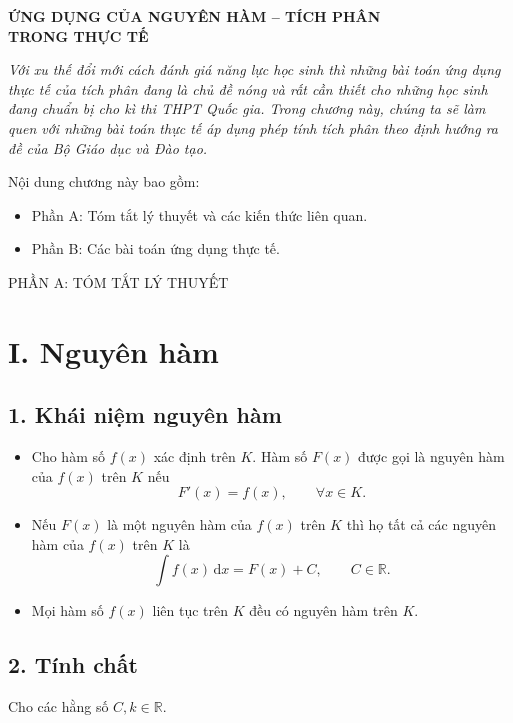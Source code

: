 \documentclass[12pt,a4paper]{article}
\newcommand{\R}{\mathbb{R}}
\newcommand{\dd}{\,\mathrm{d}}
\begin{document}
\setcounter{page}{2}

\begin{center}
{\Large\bfseries ỨNG DỤNG CỦA NGUYÊN HÀM -- TÍCH PHÂN}\\[4pt]
{\Large\bfseries TRONG THỰC TẾ}
\end{center}

\textit{Với xu thế đổi mới cách đánh giá năng lực học sinh thì những bài toán ứng dụng thực tế
của tích phân đang là chủ đề nóng và rất cần thiết cho những học sinh đang chuẩn bị
cho kì thi THPT Quốc gia. Trong chương này, chúng ta sẽ làm quen với những bài toán
thực tế áp dụng phép tính tích phân theo định hướng ra đề của Bộ Giáo dục và Đào tạo.}

Nội dung chương này bao gồm:
\begin{itemize}
\item Phần A: Tóm tắt lý thuyết và các kiến thức liên quan.
\item Phần B: Các bài toán ứng dụng thực tế.
\end{itemize}

\begin{partbox}PHẦN A: TÓM TẮT LÝ THUYẾT\end{partbox}

\section*{I. Nguyên hàm}

\subsection*{1. Khái niệm nguyên hàm}

\begin{itemize}
\item Cho hàm số $f(x)$ xác định trên $K$. Hàm số $F(x)$ được gọi là nguyên hàm của
$f(x)$ trên $K$ nếu
\[
F'(x)=f(x),\qquad \forall x\in K.
\]
\item Nếu $F(x)$ là một nguyên hàm của $f(x)$ trên $K$ thì họ tất cả các nguyên hàm của
$f(x)$ trên $K$ là
\[
\int f(x)\dd x=F(x)+C,\qquad C\in\R.
\]
\item Mọi hàm số $f(x)$ liên tục trên $K$ đều có nguyên hàm trên $K$.
\end{itemize}

\subsection*{2. Tính chất}
Cho các hằng số $C,k\in\R$.
\end{document}
